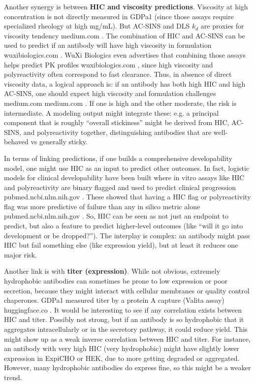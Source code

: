 \documentclass[12pt]{article}
\begin{document}
Another synergy is between \textbf{HIC and viscosity predictions}. Viscosity at high concentration is not directly measured in GDPa1 (since those assays require specialized rheology at high mg/mL). But AC-SINS and DLS $k_d$ are proxies for viscosity tendency
medium.com
. The combination of HIC and AC-SINS can be used to predict if an antibody will have high viscosity in formulation
wuxibiologics.com
. WuXi Biologics even advertises that combining those assays helps predict PK profiles
wuxibiologics.com
, since high viscosity and polyreactivity often correspond to fast clearance. Thus, in absence of direct viscosity data, a logical approach is: if an antibody has both high HIC and high AC-SINS, one should expect high viscosity and formulation challenges
medium.com
medium.com
. If one is high and the other moderate, the risk is intermediate. A modeling output might integrate these: e.g. a principal component that is roughly “overall stickiness” might be derived from HIC, AC-SINS, and polyreactivity together, distinguishing antibodies that are well-behaved vs generally sticky.

In terms of linking predictions, if one builds a comprehensive developability model, one might use HIC as an input to predict other outcomes. In fact, logistic models for clinical developability have been built where in vitro assays like HIC and polyreactivity are binary flagged and used to predict clinical progression
pubmed.ncbi.nlm.nih.gov
. These showed that having a HIC flag or polyreactivity flag was more predictive of failure than any in silico metric alone
pubmed.ncbi.nlm.nih.gov
. So, HIC can be seen as not just an endpoint to predict, but also a feature to predict higher-level outcomes (like “will it go into development or be dropped?”). The interplay is complex: an antibody might pass HIC but fail something else (like expression yield), but at least it reduces one major risk.

Another link is with \textbf{titer (expression)}. While not obvious, extremely hydrophobic antibodies can sometimes be prone to low expression or poor secretion, because they might interact with cellular membranes or quality control chaperones. GDPa1 measured titer by a protein A capture (Valita assay)
huggingface.co
. It would be interesting to see if any correlation exists between HIC and titer. Possibly not strong, but if an antibody is so hydrophobic that it aggregates intracellularly or in the secretory pathway, it could reduce yield. This might show up as a weak inverse correlation between HIC and titer. For instance, an antibody with very high HIC (very hydrophobic) might have slightly lower expression in ExpiCHO or HEK, due to more getting degraded or aggregated. However, many hydrophobic antibodies do express fine, so this might be a weaker trend.
\end{document}
